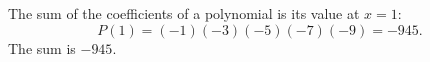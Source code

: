 The sum of the coefficients of a polynomial is its value at $x=1$:
\[
P(1)=(-1)(-3)(-5)(-7)(-9)=-945 .
\]
The sum is $\boxed{-945}$.
